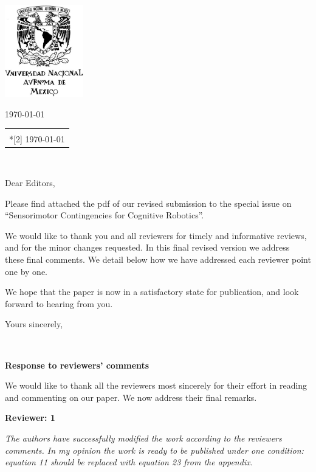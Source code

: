 \documentclass[letterpaper,12pt]{letter}
\author{Verónica Esther Arriola Ríos}
\makeatletter
\renewcommand*{\opening}[2]{\ifx\@empty\fromaddress
 \thispagestyle{firstpage}%
 {\raggedleft#2\par}%
 \else %
 \thispagestyle{empty}%
 {\raggedleft\begin{tabular}{l@{}}\ignorespaces
 \fromaddress \\*[2\parskip]%
 #2 \end{tabular}\par}%
 \fi
 \vspace{10\parskip}%
 {\raggedright \toname \\ \toaddress \par}%
 \vspace{2\parskip}%
 #1\par\nobreak}
\makeatother
\begin{document}
\begin{letter}{\textbf{}}
\includegraphics[height=4cm, keepaspectratio=true]{escudo_UNAM.jpg}\vspace*{-4cm}

\address{Universidad Nacional Autónoma de México\\ Facultad de Ciencias,\\ Departamento de Matemáticas,\\ México, D.F.}

\opening{Dear Editors,}{\today}
\vspace{1cm}

Please find attached the pdf of our revised submission to the special issue on “Sensorimotor Contingencies for Cognitive Robotics”. 

We would like to thank you and all reviewers for timely and informative reviews, and for the minor changes requested. In this final revised version we address these final comments. We detail below how we have addressed each reviewer point one by one.

We hope that the paper is now in a satisfactory state for publication, and look forward to hearing from you.


\vspace{1cm}

\signature{Verónica E. Arriola-Rios\\
Jeremy L Wyatt}

\closing{Yours sincerely,}


\end{letter}

\textbf{Response to reviewers’ comments}

We would like to thank all the reviewers most sincerely for their effort in reading and commenting on our paper.  We now address their final remarks.

\textbf{Reviewer: 1}

{\em The authors have successfully modified the work according to the reviewers comments. In my opinion the work is ready to be published under one condition: equation 11 should be replaced with equation 23 from the appendix.}
\end{document}
